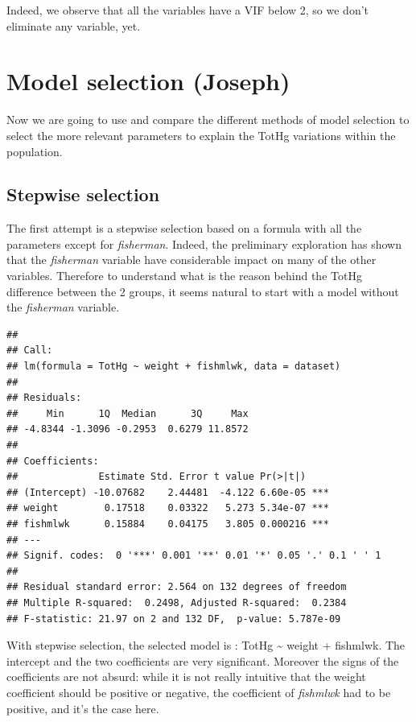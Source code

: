 \documentclass[12pt,]{article}
\begin{document}
Indeed, we observe that all the variables have a VIF below 2, so we
don't eliminate any variable, yet.

\section{Model selection (Joseph)}\label{model-selection-joseph}

Now we are going to use and compare the different methods of model
selection to select the more relevant parameters to explain the TotHg
variations within the population.

\subsection{Stepwise selection}\label{stepwise-selection}

The first attempt is a stepwise selection based on a formula with all
the parameters except for \emph{fisherman}. Indeed, the preliminary
exploration has shown that the \emph{fisherman} variable have
considerable impact on many of the other variables. Therefore to
understand what is the reason behind the TotHg difference between the 2
groups, it seems natural to start with a model without the
\emph{fisherman} variable.

\begin{verbatim}
## 
## Call:
## lm(formula = TotHg ~ weight + fishmlwk, data = dataset)
## 
## Residuals:
##     Min      1Q  Median      3Q     Max 
## -4.8344 -1.3096 -0.2953  0.6279 11.8572 
## 
## Coefficients:
##              Estimate Std. Error t value Pr(>|t|)    
## (Intercept) -10.07682    2.44481  -4.122 6.60e-05 ***
## weight        0.17518    0.03322   5.273 5.34e-07 ***
## fishmlwk      0.15884    0.04175   3.805 0.000216 ***
## ---
## Signif. codes:  0 '***' 0.001 '**' 0.01 '*' 0.05 '.' 0.1 ' ' 1
## 
## Residual standard error: 2.564 on 132 degrees of freedom
## Multiple R-squared:  0.2498, Adjusted R-squared:  0.2384 
## F-statistic: 21.97 on 2 and 132 DF,  p-value: 5.787e-09
\end{verbatim}

With stepwise selection, the selected model is : TotHg \textasciitilde{}
weight + fishmlwk. The intercept and the two coefficients are very
significant. Moreover the signs of the coefficients are not absurd:
while it is not really intuitive that the weight coefficient should be
positive or negative, the coefficient of \emph{fishmlwk} had to be
positive, and it's the case here.
\end{document}
